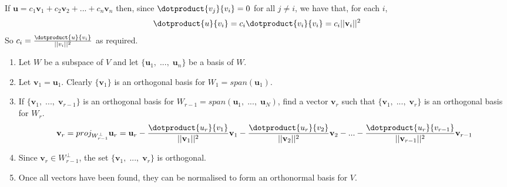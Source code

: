 {If \(\mathbf{u} = c_1\mathbf{v}_1 + c_2\mathbf{v}_2 + ... + c_n\mathbf{v}_n\) then, since \(\dotproduct{v_j}{v_i} = 0\) for all \(j \neq i\), we have that, for each \(i\), 
\begin{equation}
    \dotproduct{u}{v_i} = c_i\dotproduct{v_i}{v_i} = c_i||\mathbf{v}_i||^2
\end{equation}
So \(c_i = \frac{\dotproduct{u}{v_i}}{||v_i||^2}\) as required.}


\begin{enumerate}
    \item Let \(W\) be a subspace of \(V\) and let \(\{\mathbf{u}_1,\;...,\;\mathbf{u}_n\}\) be a basis of \(W\).
    \item Let \(\mathbf{v}_1 = \mathbf{u}_1\). Clearly \(\{\mathbf{v}_1\}\) is an orthogonal basis for \(W_1 = span(\mathbf{u}_1)\).
    \item If \(\{\mathbf{v}_1,\;...,\;\mathbf{v}_{r-1}\}\) is an orthogonal basis for \(W_{r-1} = span(\mathbf{u}_1,\;...,\;\mathbf{u}_N)\), find a vector \(\mathbf{v}_r\) such that \(\{\mathbf{v}_1,\;...,\;\mathbf{v}_{r}\}\) is an orthogonal basis for \(W_r\).
    \begin{equation}
        \mathbf{v}_r = proj_{W_{r-1}^\perp}\mathbf{u}_r = \mathbf{u}_r - \frac{\dotproduct{u_r}{v_1}}{||\mathbf{v}_1||^2}\mathbf{v}_1 - \frac{\dotproduct{u_r}{v_2}}{||\mathbf{v}_2||^2}\mathbf{v}_2 - ... - \frac{\dotproduct{u_r}{v_{r-1}}}{||\mathbf{v}_{r-1}||^2}\mathbf{v}_{r-1}
    \end{equation}
    \item Since \(\mathbf{v}_r \in W^\perp_{r-1}\), the set \(\{\mathbf{v}_1,\;...,\;\mathbf{v}_{r}\}\) is orthogonal.
    \item Once all vectors have been found, they can be normalised to form an orthonormal basis for \(V\).
\end{enumerate}

